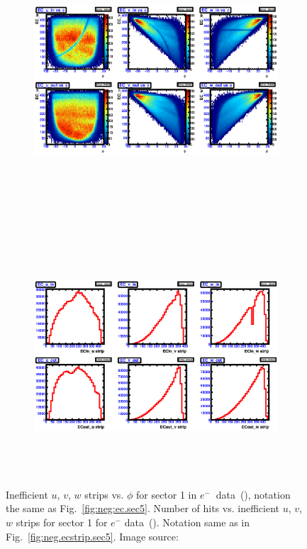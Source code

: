 \begin{figure}[htpb]
  \centering
  \begin{subfigure}[b]{\figwidth}
  \includegraphics[width=\figwidth, height=3.5in,valign=c]{figures/calib/ec/pim_ecuvw_phi_NOKnockout_sec1.eps}\caption{}\label{fig:EC_I_I}
  \end{subfigure}%
  \\
  \begin{subfigure}[b]{\figwidth}
  \includegraphics[width=\figwidth, height=3.5in,valign=c]{figures/calib/ec/pim_ecuvw_NOKnockout_sec1.eps}\caption{}\label{fig:EC_II_I}
  \end{subfigure}%
      \caption {Inefficient  $u$, $v$, $w$ strips vs. $\phi$ for sector 1 in  $e^{-} \ $ data~(), notation the same as Fig.~\ref{fig:neg:ec.sec5}. Number of hits vs. inefficient  $u$, $v$, $w$ strips for sector 1 for $e^-$ data~(). Notation same as in Fig.~\ref{fig:neg.ecstrip.sec5}. Image source:~\cite{clas.thesis.kunkel}}
        \label{fig:EC_no_I}
\end{figure}



